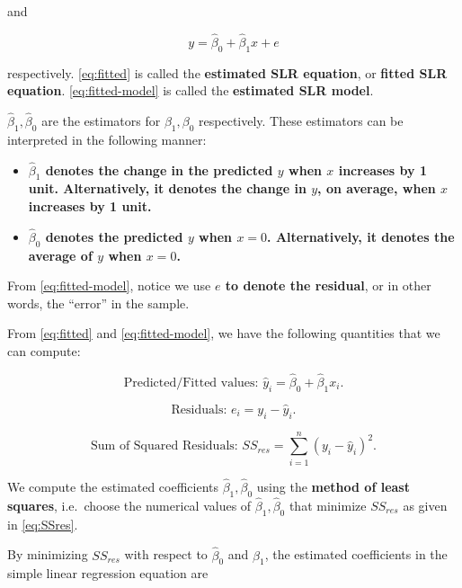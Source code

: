 \documentclass[
]{book}
\providecommand{\tightlist}{%
  \setlength{\itemsep}{0pt}\setlength{\parskip}{0pt}}
\begin{document}
and

\begin{equation} 
y=\hat{\beta}_0+\hat{\beta}_1 x + e
\label{eq:fitted-model}
\end{equation}

respectively. \eqref{eq:fitted} is called the \textbf{estimated SLR equation}, or \textbf{fitted SLR equation}. \eqref{eq:fitted-model} is called the \textbf{estimated SLR model}.

\(\hat{\beta}_1,\hat{\beta}_0\) are the estimators for \(\beta_1,\beta_0\) respectively. These estimators can be interpreted in the following manner:

\begin{itemize}
\tightlist
\item
  \textbf{\(\hat{\beta}_1\) denotes the change in the predicted \(y\) when \(x\) increases by 1 unit. Alternatively, it denotes the change in \(y\), on average, when \(x\) increases by 1 unit.}
\item
  \textbf{\(\hat{\beta}_0\) denotes the predicted \(y\) when \(x=0\). Alternatively, it denotes the average of \(y\) when \(x=0\).}
\end{itemize}

From \eqref{eq:fitted-model}, notice we use \textbf{\(e\) to denote the residual}, or in other words, the ``error'' in the sample.

From \eqref{eq:fitted} and \eqref{eq:fitted-model}, we have the following quantities that we can compute:

\begin{equation}
\text{Predicted/Fitted values: } \hat{y}_i = \hat{\beta}_0+\hat{\beta}_1 x_i.
\label{eq:fits}
\end{equation}

\begin{equation} 
\text{Residuals: } e_i = y_i-\hat{y}_i.
\label{eq:res}
\end{equation}

\begin{equation} 
\text{Sum of Squared Residuals: } SS_{res} =  \sum\limits_{i=1}^n(y_i-\hat{y}_i)^2.
\label{eq:SSres}
\end{equation}

We compute the estimated coefficients \(\hat{\beta}_1,\hat{\beta}_0\) using the \textbf{method of least squares}, i.e.~choose the numerical values of \(\hat{\beta}_1,\hat{\beta}_0\) that minimize \(SS_{res}\) as given in \eqref{eq:SSres}.

By minimizing \(SS_{res}\) with respect to \(\hat{\beta}_0\) and \(\hat{\beta}_1\), the estimated coefficients in the simple linear regression equation are
\end{document}
